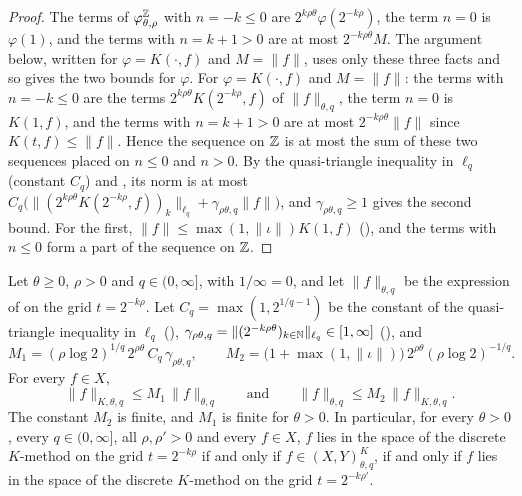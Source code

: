 \begin{proof}
\leanok
The terms of $\varphi^{\mathbb{Z}}_{\theta, \rho}$ with $n = -k \leq 0$ are
$2^{k\rho\theta} \varphi(2^{-k\rho})$, the term $n = 0$ is $\varphi(1)$, and the terms with
$n = k + 1 > 0$ are at most $2^{-k\rho\theta} M$. The argument below, written for
$\varphi = K(\cdot, f)$ and $M = \|f\|$, uses only these three facts and so gives the two bounds
for $\varphi$. For
$\varphi = K(\cdot, f)$ and $M = \|f\|$: the terms with $n = -k \leq 0$ are the terms
$2^{k\rho\theta} K(2^{-k\rho}, f)$ of $\|f\|_{\theta, q}$, the term $n = 0$ is $K(1, f)$, and
the terms with $n = k + 1 > 0$ are at most $2^{-k\rho\theta} \|f\|$ since
$K(t, f) \leq \|f\|$. Hence the sequence on $\mathbb{Z}$ is at most
the sum of these two sequences placed on $n \leq 0$ and $n > 0$. By the quasi-triangle
inequality in $\ell_q$ (constant $C_q$) and , its norm is at most
$C_q \bigl(\|(2^{k\rho\theta} K(2^{-k\rho}, f))_k\|_{\ell_q} + \gamma_{\rho\theta, q} \|f\|\bigr)$,
and $\gamma_{\rho\theta, q} \geq 1$ gives the second bound. For the first,
$\|f\| \leq \max(1, \|\iota\|) K(1, f)$ (), and the terms with
$n \leq 0$ form a part of the sequence on $\mathbb{Z}$.
\end{proof}

\begin{theorem}
\label{thm:discrete-continuous-k-method}
\leanok
{}
Let $\theta \geq 0$, $\rho > 0$ and $q \in (0, \infty]$, with $1/\infty = 0$, and let
$\|f\|_{\theta, q}$ be the expression of  on the grid $t = 2^{-k\rho}$.
Let $C_q = \max(1, 2^{1/q - 1})$ be the constant of the quasi-triangle inequality in $\ell_q$
(), $\gamma_{\rho\theta, q} =
\|(2^{-k\rho\theta})_{k \in \mathbb{N}}\|_{\ell_q} \in [1, \infty]$ (), and
\[
  M_1 = (\rho \log 2)^{1/q} \, 2^{\rho\theta} \, C_q \, \gamma_{\rho\theta, q} , \qquad
  M_2 = \bigl(1 + \max(1, \|\iota\|)\bigr) \, 2^{\rho\theta} (\rho \log 2)^{-1/q} .
\]
For every $f \in X$,
\[
  \|f\|_{K, \theta, q} \leq M_1 \, \|f\|_{\theta, q}
  \qquad \text{and} \qquad
  \|f\|_{\theta, q} \leq M_2 \, \|f\|_{K, \theta, q} .
\]
The constant $M_2$ is finite, and $M_1$ is finite for $\theta > 0$. In particular, for every
$\theta > 0$, every $q \in (0, \infty]$, all $\rho, \rho' > 0$ and every $f \in X$, $f$ lies in
the space of the discrete $K$-method on the grid $t = 2^{-k\rho}$ if and only if
$f \in (X, Y)^K_{\theta, q}$, if and only if $f$ lies in the space of the discrete $K$-method on
the grid $t = 2^{-k\rho'}$.
\end{theorem}

